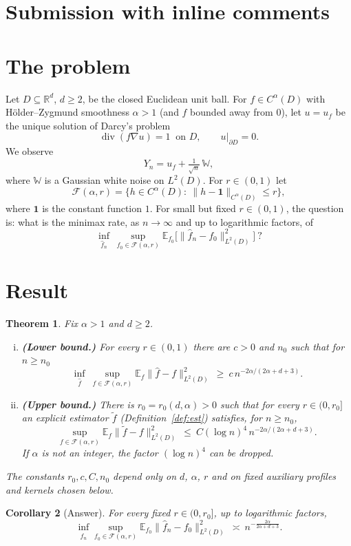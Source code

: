 \documentclass[11pt]{article}
\newtheorem{theorem}{Theorem}[section]
\newtheorem{corollary}[theorem]{Corollary}
\theoremstyle{definition}
\theoremstyle{remark}
\newcommand{\R}{\mathbb R}
\newcommand{\E}{\mathbb E}
\newcommand{\W}{\mathbb W}
\newcommand{\one}{\mathbf 1}
\newcommand{\Fc}{\mathcal F}
\newcommand{\dv}{\operatorname{div}}
\newcommand{\rate}{n^{-2\alpha/(2\alpha+d+3)}}
\begin{document}
\newpage
\section{Submission with inline comments}


\section{The problem}

Let $D\subseteq\R^d$, $d\ge2$, be the closed Euclidean unit ball. For $f\in C^\alpha(D)$ with H\"older--Zygmund smoothness $\alpha>1$ (and $f$ bounded away from $0$), let $u=u_f$ be the unique solution of Darcy's problem
\[
\dv(f\nabla u)=1\ \text{ on }D,\qquad u|_{\partial D}=0 .
\]
We observe
\[
Y_n=u_f+\tfrac1{\sqrt n}\,\W ,
\]
where $\W$ is a Gaussian white noise on $L^2(D)$. For $r\in(0,1)$ let
\[
\Fc(\alpha,r)=\{h\in C^\alpha(D):\ \|h-\one\|_{C^\alpha(D)}\le r\},
\]
where $\one$ is the constant function $1$. For small but fixed $r\in(0,1)$, the question is: what is the minimax rate, as $n\to\infty$ and up to logarithmic factors, of
\[
\inf_{\hat f_n}\ \sup_{f_0\in\Fc(\alpha,r)}\E_{f_0}\big[\|\hat f_n-f_0\|^2_{L^2(D)}\big]\ ?
\]


\section{Result}

\begin{theorem}\label{thm:main}
Fix $\alpha>1$ and $d\ge2$.
\begin{enumerate}[(i)]
\item \textbf{(Lower bound.)} For every $r\in(0,1)$ there are $c>0$ and $n_0$ such that for $n\ge n_0$
\[
\inf_{\hat f}\ \sup_{f\in\Fc(\alpha,r)}\E_f\|\hat f-f\|^2_{L^2(D)}\ \ge\ c\,\rate .
\]
\item \textbf{(Upper bound.)} There is $r_0=r_0(d,\alpha)>0$ such that for every $r\in(0,r_0]$ an explicit estimator $\tilde f$ (Definition~\ref{def:est}) satisfies, for $n\ge n_0$,
\[
\sup_{f\in\Fc(\alpha,r)}\E_f\|\tilde f-f\|^2_{L^2(D)}\ \le\ C(\log n)^4\,\rate .
\]
If $\alpha$ is not an integer, the factor $(\log n)^4$ can be dropped.
\end{enumerate}
The constants $r_0,c,C,n_0$ depend only on $d$, $\alpha$, $r$ and on fixed auxiliary profiles and kernels chosen below.
\end{theorem}

\begin{corollary}[Answer]
For every fixed $r\in(0,r_0]$, up to logarithmic factors,
\[
\inf_{\hat f_n}\sup_{f_0\in\Fc(\alpha,r)}\E_{f_0}\|\hat f_n-f_0\|^2_{L^2(D)}\ \asymp\ n^{-\frac{2\alpha}{2\alpha+d+3}} .
\]
\end{corollary}
\end{document}
